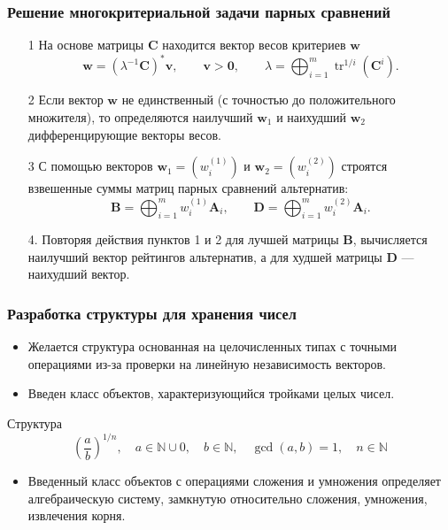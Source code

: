 \documentclass[ucs, notheorems, handout]{beamer}
\begin{document}
\begin{frame}
    \frametitle{Решение многокритериальной задачи парных сравнений}
    \begin{itemize}
        \item[1] На основе матрицы $\bm{C}$ находится вектор весов критериев $\bm{w}$
        $$\bm{w} =
        (\lambda^{-1}\bm{C})^{\ast}\bm{v},
        \qquad \bm{v}>\bm{0},
        \qquad \lambda =
        \bigoplus_{i=1}^{m}{\mathop\mathrm{tr}}^{1/i}(\bm{C}^{i}).$$
        \item[2] Если вектор $\bm{w}$ не единственный (с точностью до положительного множителя), то определяются наилучший $\bm{w}_{1}$ и наихудший $\bm{w}_{2}$ дифференцирующие векторы весов.
        \item[3]
        С помощью векторов $\bm{w}_{1}=(w_{i}^{(1)})$ и $\bm{w}_{2}=(w_{i}^{(2)})$ строятся взвешенные суммы матриц парных сравнений альтернатив:
        $$\bm{B} =
        \bigoplus_{i=1}^{m}w^{(1)}_{i}\bm{A}_{i},
        \qquad \bm{D} =
        \bigoplus_{i=1}^{m}w^{(2)}_{i}\bm{A}_{i}.$$
        \item[4.]
        Повторяя действия пунктов 1 и 2 для лучшей матрицы $\bm{B}$, вычисляется наилучший вектор рейтингов альтернатив, а для худшей матрицы $\bm{D}$ --- наихудший вектор.
 
    \end{itemize}
\end{frame}

\begin{frame}
    \frametitle{Разработка структуры для хранения чисел}

    \begin{itemize}
        \item Желается структура основанная на целочисленных типах с точными операциями из-за проверки на линейную независимость векторов.
        \item Введен класс объектов, характеризующийся тройками целых чисел.
    \end{itemize}
    \begin{block}{Структура}
        $$\displaystyle \left(\frac{a}{b}\right)^{1/n}, \quad a \in \mathbb{N} \cup 0, \quad b \in \mathbb{N}, \quad \gcd(a, b) = 1, \quad n \in \mathbb{N}$$
    \end{block}
    \begin{itemize}
        \item Введенный класс объектов с операциями сложения и умножения определяет алгебраическую систему, замкнутую относительно сложения, умножения, извлечения корня.
    \end{itemize}

\end{frame}
\end{document}
